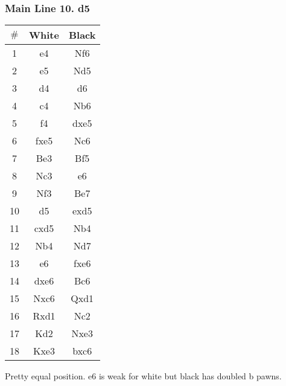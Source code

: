\documentclass{article}
\newcommand{\smalls}{\par\smallskip}
\begin{document}
        \subsubsection*{Main Line 10. d5}
        \begin{multicols}{2}
            \showboard
            \smalls
            \begin{tabular}{c|c|c}
                $\#$ & White & Black\\
                \hline
                1 & e4 & Nf6 \\
                2 & e5 & Nd5 \\
                3 & d4 & d6 \\
                4 & c4 & Nb6 \\
                5 & f4 & dxe5 \\
                6 & fxe5 & Nc6 \\
                7 & Be3 & Bf5 \\
                8 & Nc3 & e6 \\
                9 & Nf3 & Be7 \\
                10 & d5 & exd5 \\
                11 & cxd5 & Nb4 \\
                12 & Nb4 & Nd7 \\
                13 & e6 & fxe6 \\
                14 & dxe6 & Bc6 \\
                15 & Nxc6 & Qxd1 \\
                16 & Rxd1 & Nc2 \\
                17 & Kd2 & Nxe3 \\
                18 & Kxe3 & bxc6 \\
            \end{tabular}
        \end{multicols}
        Pretty equal position.  e6 is weak for white but black has doubled b
        pawns.
        \smalls
        \newpage
\end{document}
